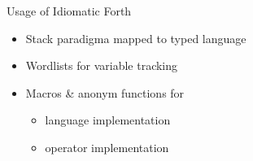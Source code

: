 \documentclass{beamer}
\begin{document}
\begin{frame}
    Usage of Idiomatic Forth
    \begin{itemize}
    \item Stack paradigma mapped to typed language
    \item Wordlists for variable tracking 
    \item Macros \& anonym functions for 
        \begin{itemize}
            \item language implementation
            \item operator implementation
        \end{itemize}
    \end{itemize}
\end{frame}
\end{document}
